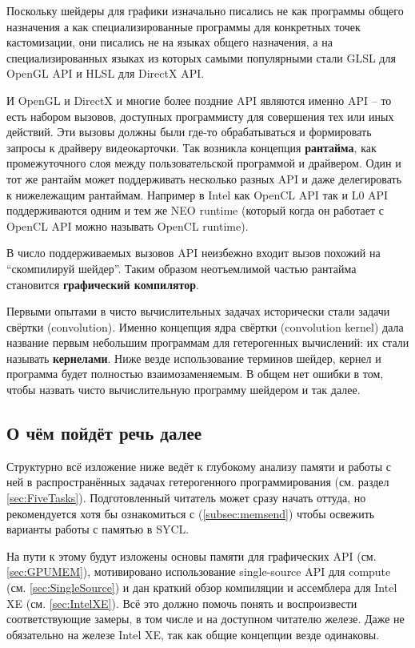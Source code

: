 \documentclass[a4paper,12pt,oneside]{article}
\begin{document}
Поскольку шейдеры для графики изначально писались не как программы общего назначения а как специализированные программы для конкретных точек кастомизации, они писались не на языках общего назначения, а на специализированных языках из которых самыми популярными стали GLSL для OpenGL API и HLSL для DirectX API.

И OpenGL и DirectX и многие более поздние API являются именно API -- то есть набором вызовов, доступных программисту для совершения тех или иных действий.
Эти вызовы должны были где-то обрабатываться и формировать запросы к драйверу видеокарточки.
Так возникла концепция \textbf{рантайма}, как промежуточного слоя между пользовательской программой и драйвером.
Один и тот же рантайм может поддерживать несколько разных API и даже делегировать к нижележащим рантаймам.
Например в Intel как OpenCL API так и L0 API поддерживаются одним и тем же NEO runtime (который когда он работает с OpenCL API можно называть OpenCL runtime).

В число поддерживаемых вызовов API неизбежно входит вызов похожий на ``скомпилируй шейдер''. Таким образом неотъемлимой частью рантайма становится \textbf{графический компилятор}.

Первыми опытами в чисто вычислительных задачах исторически стали задачи свёртки (convolution). 
Именно концепция ядра свёртки (convolution kernel) дала название первым небольшим программам для гетерогенных вычислений: их стали называть \textbf{кернелами}.
Ниже везде использование терминов шейдер, кернел и программа будет полностью взаимозаменяемым.
В общем нет ошибки в том, чтобы назвать чисто вычислительную программу шейдером и так далее.

\subsection{О чём пойдёт речь далее}\label{subsec:about}

Структурно всё изложение ниже ведёт к глубокому анализу памяти и работы с ней в распространённых задачах гетерогенного программирования (см. раздел \ref{sec:FiveTasks}). Подготовленный читатель может сразу начать оттуда, но рекомендуется хотя бы ознакомиться с (\ref{subsec:memsend}) чтобы освежить варианты работы с памятью в SYCL.

На пути к этому будут изложены основы памяти для графических API (см. \ref{sec:GPUMEM}), мотивировано использование single-source API для compute (см. \ref{sec:SingleSource}) и дан краткий обзор компиляции и ассемблера для Intel XE (см. \ref{sec:IntelXE}).
Всё это должно помочь понять и воспроизвести соответствующие замеры, в том числе и на доступном читателю железе.
Даже не обязательно на железе Intel XE, так как общие концепции везде одинаковы.
\end{document}
